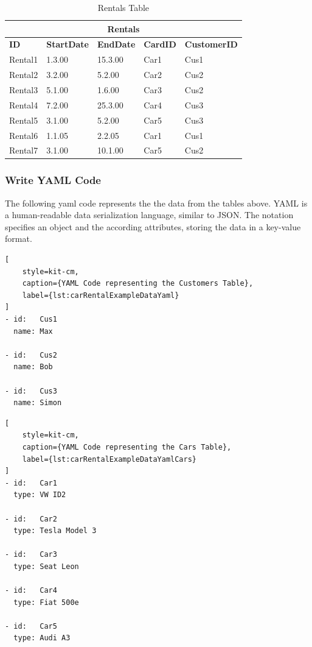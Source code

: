 \begin{table}[H]
    \centering
    \caption{Rentals Table}    
    \label{tab:carRentalExampleDataRentals}
    \begin{tabular}{|p{2cm}|p{2cm}|p{2cm}|p{2cm}|p{3cm}|}
        \hline
        \multicolumn{5}{|c|}{\textbf{Rentals}} \\
        \hline
        \textbf{ID} & \textbf{StartDate} & \textbf{EndDate} & \textbf{CardID} & \textbf{CustomerID} \\        
        \hline
        Rental1 & 1.3.00 & 15.3.00 & Car1 & Cus1 \\
        Rental2 & 3.2.00 & 5.2.00 & Car2 & Cus2 \\
        Rental3 & 5.1.00 & 1.6.00 & Car3 & Cus2 \\
        Rental4 & 7.2.00 & 25.3.00 & Car4 & Cus3 \\
        Rental5 & 3.1.00 & 5.2.00 & Car5 & Cus3 \\
        Rental6 & 1.1.05 & 2.2.05 & Car1 & Cus1 \\
        Rental7 & 3.1.00 & 10.1.00 & Car5 & Cus2 \\
        \hline
    \end{tabular}
\end{table}

\subsubsection*{Write YAML Code}
The following yaml code represents the the data from the tables above.
YAML is a human-readable data serialization language, similar to JSON.
The notation specifies an object and the according attributes, storing the data in a key-value format.

\begin{lstlisting}[
    style=kit-cm,
    caption={YAML Code representing the Customers Table},
    label={lst:carRentalExampleDataYaml}
]
- id:   Cus1
  name: Max

- id:   Cus2
  name: Bob

- id:   Cus3
  name: Simon
\end{lstlisting}

\begin{lstlisting}[
    style=kit-cm,
    caption={YAML Code representing the Cars Table},
    label={lst:carRentalExampleDataYamlCars}
]
- id:   Car1
  type: VW ID2

- id:   Car2
  type: Tesla Model 3

- id:   Car3
  type: Seat Leon

- id:   Car4
  type: Fiat 500e

- id:   Car5
  type: Audi A3
\end{lstlisting}

